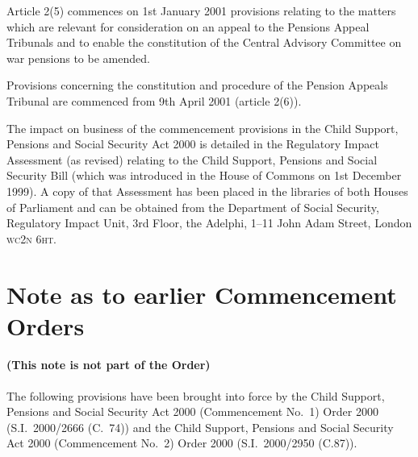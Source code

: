 \documentclass[12pt,a4paper]{article}
\begin{document}
Article 2(5) commences on 1st January 2001 provisions relating to the matters which are relevant for consideration on an appeal to the Pensions Appeal Tribunals and to enable the constitution of the Central Advisory Committee on war pensions to be amended.

Provisions concerning the constitution and procedure of the Pension Appeals Tribunal are commenced from 9th April 2001 (article 2(6)).

The impact on business of the commencement provisions in the Child Support, Pensions and Social Security Act 2000 is detailed in the Regulatory Impact Assessment (as revised) relating to the Child Support, Pensions and Social Security Bill (which was introduced in the House of Commons on 1st December 1999). A copy of that Assessment has been placed in the libraries of both Houses of Parliament and can be obtained from the Department of Social Security, Regulatory Impact Unit, 3rd Floor, the Adelphi, 1--11 John Adam Street, London \textsc{\lowercase{WC2N 6HT}}.

\part{Note as to earlier Commencement Orders}

\renewcommand\parthead{--- Note as to earlier Commencement Orders}

\subsection*{(This note is not part of the Order)}

The following provisions have been brought into force by the Child Support, Pensions and Social Security Act 2000 (Commencement No.\ 1) Order 2000 (S.I.\ 2000/2666 (C.\ 74)) and the Child Support, Pensions and Social Security Act 2000 (Commencement No.\ 2) Order 2000 (S.I.\ 2000/2950 (C.87)). 
\end{document}
